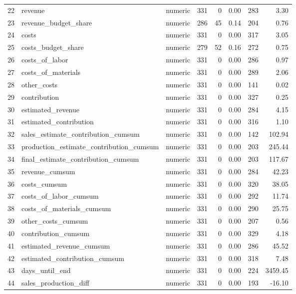 \begin{sidewaystable}[ht]
\begin{tabular}{rllrrrrr}
  22 & revenue & numeric & 331 &   0 & 0.00 & 283 & 3.30 \\ 
  23 & revenue\_budget\_share & numeric & 286 &  45 & 0.14 & 204 & 0.76 \\ 
  24 & costs & numeric & 331 &   0 & 0.00 & 317 & 3.05 \\ 
  25 & costs\_budget\_share & numeric & 279 &  52 & 0.16 & 272 & 0.75 \\ 
  26 & costs\_of\_labor & numeric & 331 &   0 & 0.00 & 286 & 0.97 \\ 
  27 & costs\_of\_materials & numeric & 331 &   0 & 0.00 & 289 & 2.06 \\ 
  28 & other\_costs & numeric & 331 &   0 & 0.00 & 141 & 0.02 \\ 
  29 & contribution & numeric & 331 &   0 & 0.00 & 327 & 0.25 \\ 
  30 & estimated\_revenue & numeric & 331 &   0 & 0.00 & 284 & 4.15 \\ 
  31 & estimated\_contribution & numeric & 331 &   0 & 0.00 & 316 & 1.10 \\ 
  32 & sales\_estimate\_contribution\_cumsum & numeric & 331 &   0 & 0.00 & 142 & 102.94 \\ 
  33 & production\_estimate\_contribution\_cumsum & numeric & 331 &   0 & 0.00 & 203 & 245.44 \\ 
  34 & final\_estimate\_contribution\_cumsum & numeric & 331 &   0 & 0.00 & 203 & 117.67 \\ 
  35 & revenue\_cumsum & numeric & 331 &   0 & 0.00 & 284 & 42.23 \\ 
  36 & costs\_cumsum & numeric & 331 &   0 & 0.00 & 320 & 38.05 \\ 
  37 & costs\_of\_labor\_cumsum & numeric & 331 &   0 & 0.00 & 292 & 11.74 \\ 
  38 & costs\_of\_materials\_cumsum & numeric & 331 &   0 & 0.00 & 290 & 25.75 \\ 
  39 & other\_costs\_cumsum & numeric & 331 &   0 & 0.00 & 207 & 0.56 \\ 
  40 & contribution\_cumsum & numeric & 331 &   0 & 0.00 & 329 & 4.18 \\ 
  41 & estimated\_revenue\_cumsum & numeric & 331 &   0 & 0.00 & 286 & 45.52 \\ 
  42 & estimated\_contribution\_cumsum & numeric & 331 &   0 & 0.00 & 318 & 7.48 \\ 
  43 & days\_until\_end & numeric & 331 &   0 & 0.00 & 224 & 3459.45 \\ 
  44 & sales\_production\_diff & numeric & 331 &   0 & 0.00 & 193 & -16.10 \\ 

\end{tabular}
\end{sidewaystable}
